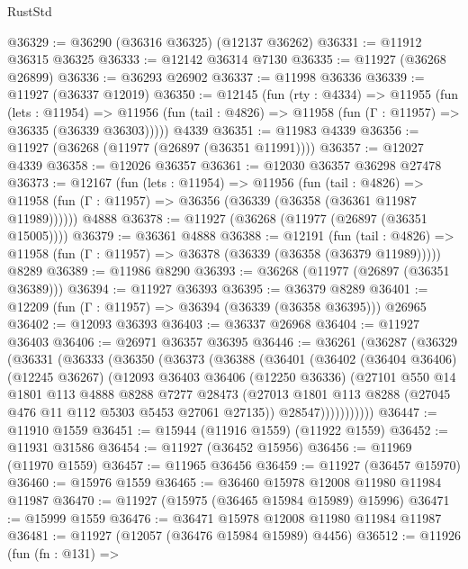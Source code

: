 \begin{lexlean}{RustStd}
\begin{coremodule}
@36329 := @36290 (@36316 @36325) (@12137 @36262)
@36331 := @11912 @36315 @36325
@36333 := @12142 @36314 @7130
@36335 := @11927 (@36268 @26899)
@36336 := @36293 @26902
@36337 := @11998 @36336
@36339 := @11927 (@36337 @12019)
@36350 := @12145
    (fun (rty : @4334) =>
    @11955
      (fun (lets : @11954) =>
      @11956 (fun (tail : @4826) => @11958 (fun (Γ : @11957) => @36335 (@36339 @36303)))))
    @4339
@36351 := @11983 @4339
@36356 := @11927 (@36268 (@11977 (@26897 (@36351 @11991))))
@36357 := @12027 @4339
@36358 := @12026 @36357
@36361 := @12030 @36357 @36298 @27478
@36373 := @12167
    (fun (lets : @11954) =>
    @11956
      (fun (tail : @4826) =>
      @11958 (fun (Γ : @11957) => @36356 (@36339 (@36358 (@36361 @11987 @11989))))))
    @4888
@36378 := @11927 (@36268 (@11977 (@26897 (@36351 @15005))))
@36379 := @36361 @4888
@36388 := @12191
    (fun (tail : @4826) => @11958 (fun (Γ : @11957) => @36378 (@36339 (@36358 (@36379 @11989)))))
    @8289
@36389 := @11986 @8290
@36393 := @36268 (@11977 (@26897 (@36351 @36389)))
@36394 := @11927 @36393
@36395 := @36379 @8289
@36401 := @12209 (fun (Γ : @11957) => @36394 (@36339 (@36358 @36395))) @26965
@36402 := @12093 @36393
@36403 := @36337 @26968
@36404 := @11927 @36403
@36406 := @26971 @36357 @36395
@36446 := @36261
    (@36287
      (@36329
        (@36331
          (@36333
            (@36350
              (@36373
                (@36388
                  (@36401
                    (@36402
                      (@36404 @36406)
                      (@12245 @36267)
                      (@12093
                        @36403
                        @36406
                        (@12250 @36336)
                        (@27101
                          @550
                          @14
                          @1801
                          @113
                          @4888
                          @8288
                          @7277
                          @28473
                          (@27013 @1801 @113 @8288 (@27045 @476 @11 @112 @5303 @5453 @27061 @27135))
                          @28547)))))))))))
@36447 := @11910 @1559
@36451 := @15944 (@11916 @1559) (@11922 @1559)
@36452 := @11931 @31586
@36454 := @11927 (@36452 @15956)
@36456 := @11969 (@11970 @1559)
@36457 := @11965 @36456
@36459 := @11927 (@36457 @15970)
@36460 := @15976 @1559
@36465 := @36460 @15978 @12008 @11980 @11984 @11987
@36470 := @11927 (@15975 (@36465 @15984 @15989) @15996)
@36471 := @15999 @1559
@36476 := @36471 @15978 @12008 @11980 @11984 @11987
@36481 := @11927 (@12057 (@36476 @15984 @15989) @4456)
@36512 := @11926
    (fun (fn : @131) =>

\end{coremodule}
\end{lexlean}
